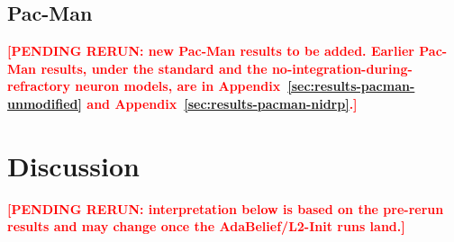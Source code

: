 \documentclass[10pt,twocolumn]{article}
\newcommand{\pending}[1]{\textcolor{red}{\bfseries[PENDING RERUN#1]}}
\begin{document}
\subsection{Pac-Man}
\label{sec:results-pacman}

\pending{: new Pac-Man results to be added. Earlier Pac-Man results, under
the standard and the no-integration-during-refractory neuron models, are in
Appendix~\ref{sec:results-pacman-unmodified} and
Appendix~\ref{sec:results-pacman-nidrp}.}

\section{Discussion}
\label{sec:discussion}
\pending{: interpretation below is based on the pre-rerun results and may
change once the AdaBelief/L2-Init runs land.}
\end{document}
